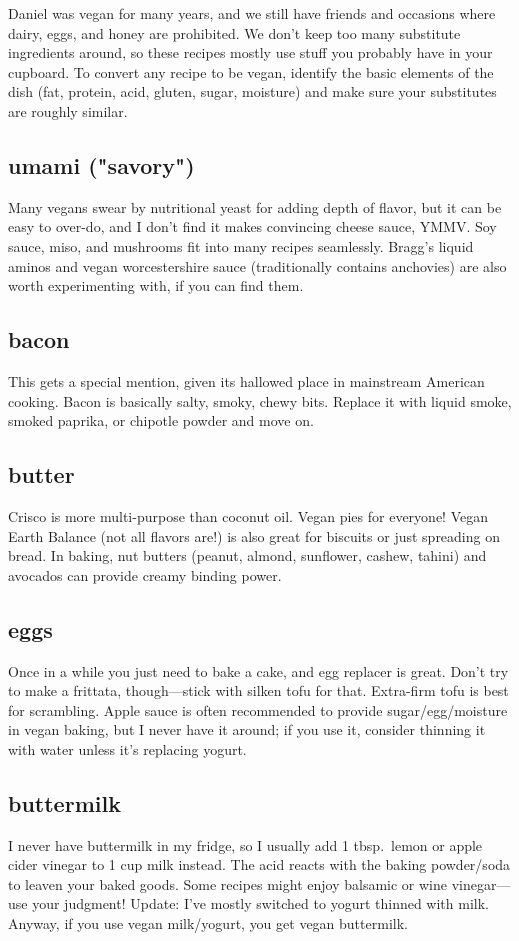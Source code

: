 Daniel was vegan for many years, and we still have friends and occasions where dairy, eggs, and honey are prohibited. We don't keep too many substitute ingredients around, so these recipes mostly use stuff you probably have in your cupboard. To convert any recipe to be vegan, identify the basic elements of the dish (fat, protein, acid, gluten, sugar, moisture) and make sure your substitutes are roughly similar.

\subsection{umami ("savory")}
Many vegans swear by nutritional yeast for adding depth of flavor, but it can be easy to over-do, and I don't find it makes convincing cheese sauce, YMMV. Soy sauce, miso, and mushrooms fit into many recipes seamlessly. Bragg's liquid aminos and vegan worcestershire sauce (traditionally contains anchovies) are also worth experimenting with, if you can find them.

\subsection{bacon}
This gets a special mention, given its hallowed place in mainstream American cooking. Bacon is basically salty, smoky, chewy bits. Replace it with liquid smoke, smoked paprika, or chipotle powder and move on.

\subsection{butter}
Crisco is more multi-purpose than coconut oil. Vegan pies for everyone! Vegan Earth Balance (not all flavors are!) is also great for biscuits or just spreading on bread. In baking, nut butters (peanut, almond, sunflower, cashew, tahini) and avocados can provide creamy binding power.

\subsection{eggs}
Once in a while you just need to bake a cake, and egg replacer is great. Don't try to make a frittata, though---stick with silken tofu for that. Extra-firm tofu is best for scrambling. Apple sauce is often recommended to provide sugar/egg/moisture in vegan baking, but I never have it around; if you use it, consider thinning it with water unless it's replacing yogurt.

\subsection{buttermilk}
I never have buttermilk in my fridge, so I usually add 1 tbsp.\ lemon or apple cider vinegar to 1 cup milk instead. The acid reacts with the baking powder/soda to leaven your baked goods. Some recipes might enjoy balsamic or wine vinegar---use your judgment! Update: I've mostly switched to yogurt thinned with milk. Anyway, if you use vegan milk/yogurt, you get vegan buttermilk.

